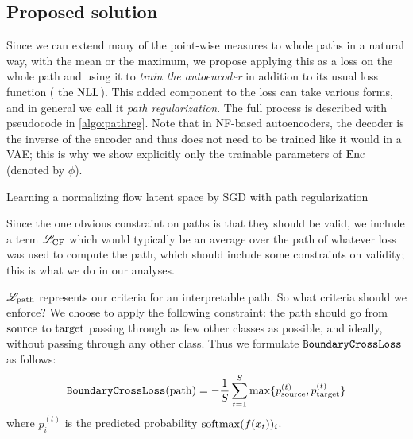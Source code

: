 \documentclass[../main.tex]{subfiles}
\begin{document}
\subsection{Proposed solution}

Since we can extend many of the point-wise measures to whole paths in a natural way, \eg{} with the mean or the maximum, we propose applying this as a loss on the whole path and using it to \emph{train the autoencoder} in addition to its usual loss function (\eg{} the $\text{NLL}$).
This added component to the loss can take various forms, and in general we call it \emph{path regularization}.
The full process is described with pseudocode in \autoref{algo:pathreg}.
Note that in NF-based autoencoders, the decoder is the inverse of the encoder and thus does not need to be trained like it would in a VAE; this is why we show explicitly only the trainable parameters of $\operatorname{Enc}$ (denoted by $\phi$).

\begin{algorithm}
\caption{Learning a normalizing flow latent space by SGD with path regularization}
\label{algo:pathreg}
\end{algorithm}

Since the one obvious constraint on paths is that they should be valid, we include a term $\mathscr{L}_\text{CF}$ which would typically be an average over the path of whatever loss was used to compute the path, which should include some constraints on validity; this is what we do in our analyses.

$\mathscr{L}_\text{path}$ represents our criteria for an interpretable path. So what criteria should we enforce?
We choose to apply the following constraint: the path should go from $\mathrm{source}$ to $\mathrm{target}$ passing through as few other classes as possible, and ideally, without passing through any other class.
Thus we formulate $\mathtt{BoundaryCrossLoss}$ as follows:
\begin{align*}
\mathtt{BoundaryCrossLoss}(\mathrm{path}) = -
\frac{1}{S} \sum_{t=1}^{S}
\max \{ p^{(t)}_{\mathrm{source}}, p^{(t)}_{\mathrm{target}} \}
\end{align*}
where $p^{(t)}_i$ is the predicted probability $\mathrm{softmax}(f(x_t))_i$.
\end{document}
